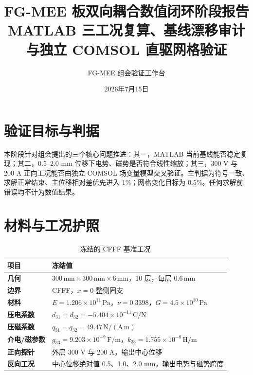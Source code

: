 \documentclass[UTF8,fontset=windows,11pt,a4paper]{ctexart}
\title{\textbf{FG-MEE 板双向耦合数值闭环阶段报告}\\[0.35em]\large MATLAB 三工况复算、基线漂移审计与独立 COMSOL 直驱网格验证}
\author{FG-MEE 组会验证工作台}
\date{2026年7月15日}
\begin{document}
\maketitle
\begin{center}
\end{center}

\tableofcontents
\newpage

\section{验证目标与判据}
本阶段针对组会提出的三个核心问题推进：其一，MATLAB 当前基线能否稳定复现；其二，0.5--2.0 mm 位移下电势、磁势是否符合线性缩放；其三，300 V 与 200 A 正向工况能否由独立 COMSOL 场变量模型交叉验证。主判据为符号一致、求解正常结束、主位移相对差优先进入 $1\%$；网格变化目标为 $0.5\%$。任何求解前错误均不计为数值结果。

\section{材料与工况护照}
\begin{table}[H]
\centering
\caption{冻结的 CFFF 基准工况}
\begin{tabularx}{\textwidth}{>{\bfseries}lX}
\toprule
项目 & 冻结值 \\
\midrule
几何 & $300\,\mathrm{mm}\times300\,\mathrm{mm}\times6\,\mathrm{mm}$，10 层，每层 $0.6\,\mathrm{mm}$ \\
边界 & CFFF，$x=0$ 整侧固支 \\
材料 & $E=1.206\times10^{11}\,\mathrm{Pa}$，$\nu=0.3398$，$G=4.5\times10^{10}\,\mathrm{Pa}$ \\
压电系数 & $d_{31}=d_{32}=-5.404\times10^{-11}\,\mathrm{C/N}$ \\
压磁系数 & $q_{31}=q_{32}=49.47\,\mathrm{N/(A\,m)}$ \\
介电/磁参数 & $g_{33}=9.203\times10^{-9}\,\mathrm{F/m}$，$k_{33}=1.755\times10^{-8}\,\mathrm{H/m}$ \\
正向探针 & 外层 300 V 与 200 A，输出中心位移 \\
反向工况 & 中心位移绝对值 0.5、1.0、2.0 mm，输出电势与磁势跨度 \\
\bottomrule
\end{tabularx}
\end{table}
\end{document}
